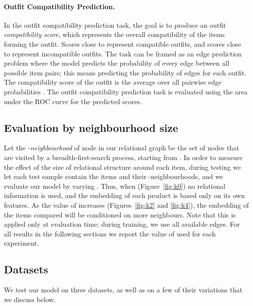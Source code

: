 \documentclass[10pt,twocolumn,letterpaper]{article}
\begin{document}
\paragraph{Outfit Compatibility Prediction.}
\label{sssec:compat}
In the outfit compatibility prediction task, the goal is to produce an outfit \emph{compatibility score}, which represents the overall compatibility of the items forming the outfit. Scores close to  represent compatible outfits, and scores close to  represent incompatible outfits. The task can be framed as an edge prediction problem where the model predicts the probability of every edge between all possible item pairs; this means predicting the probability of  edges for each outfit. The compatibility score of the outfit is the average over all pairwise edge probabilities .
The outfit compatibility prediction task is evaluated using the area under the ROC curve for the predicted scores.





\subsection{Evaluation by neighbourhood size}
\label{ssec:evaluation}
Let the \emph{-neighbourhood} of node  in our relational graph be the set of  nodes that are visited by a breadth-first-search process, starting from . In order to measure the effect of the size of relational structure around each item, during testing we let each test sample contain the items and their -neighbourhoods, and we evaluate our model by varying .
Thus, when  (Figure~\ref{fig:k0}) no relational information is used, and the embedding of each product is based only on its own features. As the value of  increases (Figures~\ref{fig:k2} and \ref{fig:k4}), the embedding of the items compared will be conditioned on more neighbours. 
Note that this is applied only at evaluation time; during training, we use all available edges. For all results in the following sections we report the value of  used for each experiment.

\subsection{Datasets}
\label{ssec:datasets}
We test our model on three datasets, as well as on a few of their variations that we discuss below.
\end{document}
